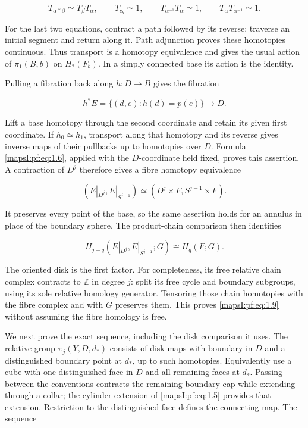 \documentclass[11pt]{article}
\begin{document}
\begin{equation}
T_{\alpha*\beta}\simeq T_\beta T_\alpha,\qquad
T_{c_b}\simeq1,\qquad
T_{\alpha^{-1}}T_\alpha\simeq1,\qquad
T_\alpha T_{\alpha^{-1}}\simeq1.
\label{mapsI:pf:eq:1.6}
\end{equation}

For the last two equations, contract a path followed by its reverse: traverse an initial segment and return along it. Path adjunction proves these homotopies continuous. Thus transport is a homotopy equivalence and gives the usual action of \(\pi_1(B,b)\) on \(H_*(F_b)\). In a simply connected base its action is the identity.

Pulling a fibration back along \(h:D\to B\) gives the fibration

\begin{equation}
h^*E=\{(d,e):h(d)=p(e)\}\longrightarrow D.
\label{mapsI:pf:eq:1.7}
\end{equation}

Lift a base homotopy through the second coordinate and retain its given first coordinate. If \(h_0\simeq h_1\), transport along that homotopy and its reverse gives inverse maps of their pullbacks up to homotopies over \(D\). Formula \eqref{mapsI:pf:eq:1.6}, applied with the \(D\)-coordinate held fixed, proves this assertion. A contraction of \(D^j\) therefore gives a fibre homotopy equivalence

\begin{equation}
(E|_{D^j},E|_{S^{j-1}})
\simeq(D^j\times F,S^{j-1}\times F).
\label{mapsI:pf:eq:1.8}
\end{equation}

It preserves every point of the base, so the same assertion holds for an annulus in place of the boundary sphere. The product-chain comparison then identifies

\begin{equation}
H_{j+q}(E|_{D^j},E|_{S^{j-1}};G)\cong H_q(F;G).
\label{mapsI:pf:eq:1.9}
\end{equation}

The oriented disk is the first factor. For completeness, its free relative chain complex contracts to \(\mathbb Z\) in degree \(j\): split its free cycle and boundary subgroups, using its sole relative homology generator. Tensoring those chain homotopies with the fibre complex and with \(G\) preserves them. This proves \eqref{mapsI:pf:eq:1.9} without assuming the fibre homology is free.

We next prove the exact sequence, including the disk comparison it uses. The relative group \(\pi_j(Y,D,d_*)\) consists of disk maps with boundary in \(D\) and a distinguished boundary point at \(d_*\), up to such homotopies. Equivalently use a cube with one distinguished face in \(D\) and all remaining faces at \(d_*\). Passing between the conventions contracts the remaining boundary cap while extending through a collar; the cylinder extension of \eqref{mapsI:pf:eq:1.5} provides that extension. Restriction to the distinguished face defines the connecting map. The sequence
\end{document}
